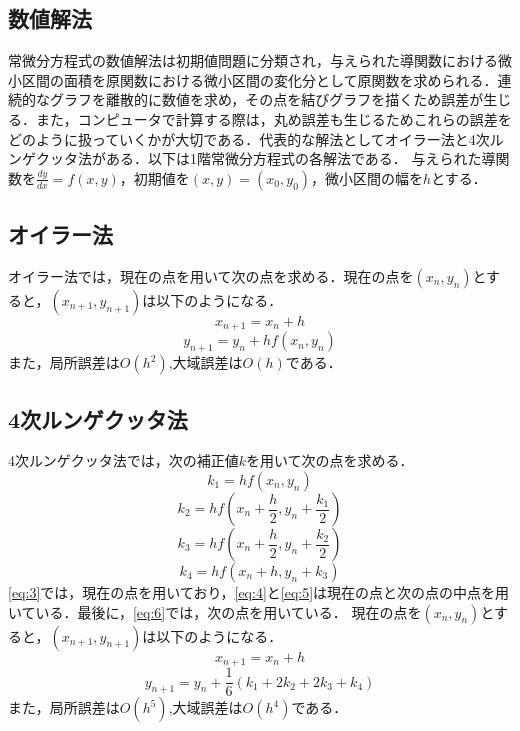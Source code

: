 \documentclass[a4paper, 12pt]{ltjsarticle}
\begin{document}
\subsection{数値解法}
常微分方程式の数値解法は初期値問題に分類され，与えられた導関数における微小区間の面積を原関数における微小区間の変化分として原関数を求められる．連続的なグラフを離散的に数値を求め，その点を結びグラフを描くため誤差が生じる．また，コンピュータで計算する際は，丸め誤差も生じるためこれらの誤差をどのように扱っていくかが大切である．代表的な解法としてオイラー法と4次ルンゲクッタ法がある．以下は1階常微分方程式の各解法である．
与えられた導関数を$\frac{dy}{dx}=f(x,y)$，初期値を$(x,y)=(x_0,y_0)$，微小区間の幅を$h$とする．
\subsection{オイラー法}
オイラー法では，現在の点を用いて次の点を求める．現在の点を$(x_n,y_n)$とすると，$(x_{n+1},y_{n+1})$は以下のようになる．
\begin{equation}
  x_{n+1}=x_n+h
\end{equation}
\begin{equation}
  y_{n+1}=y_n+hf(x_n,y_n)
\end{equation}
また，局所誤差は$O(h^2)$,大域誤差は$O(h)$である．
\clearpage
\subsection{4次ルンゲクッタ法}
4次ルンゲクッタ法では，次の補正値$k$を用いて次の点を求める．
\begin{equation}
  k_1=hf(x_n,y_n)\label{eq:3}
\end{equation}
\begin{equation}
  k_2=hf(x_n+\frac{h}{2},y_n+\frac{k_1}{2})\label{eq:4}
\end{equation}
\begin{equation}
  k_3=hf(x_n+\frac{h}{2},y_n+\frac{k_2}{2})\label{eq:5}
\end{equation}
\begin{equation}
  k_4=hf(x_n+h,y_n+k_3)\label{eq:6}
\end{equation}
\eqref{eq:3}では，現在の点を用いており，\eqref{eq:4}と\eqref{eq:5}は現在の点と次の点の中点を用いている．最後に，\eqref{eq:6}では，次の点を用いている．
現在の点を$(x_n,y_n)$とすると，$(x_{n+1},y_{n+1})$は以下のようになる．
\begin{equation}
  x_{n+1}=x_n+h
\end{equation}
\begin{equation}
  y_{n+1}=y_n+\frac{1}{6}(k_1+2k_2+2k_3+k_4)
\end{equation}
また，局所誤差は$O(h^5)$,大域誤差は$O(h^4)$である．
\clearpage
\end{document}
